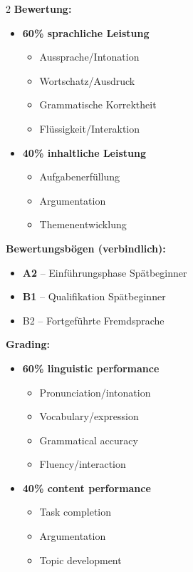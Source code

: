 \documentclass[10pt,a4paper]{article}
\begin{document}
\begin{paracol}{2}
\small
\textbf{Bewertung:}
\begin{itemize}[noitemsep,topsep=2pt]
\item \textbf{60\% sprachliche Leistung}
\begin{itemize}[noitemsep,topsep=1pt]
\item[-] Aussprache/Intonation
\item[-] Wortschatz/Ausdruck
\item[-] Grammatische Korrektheit
\item[-] Flüssigkeit/Interaktion
\end{itemize}
\item \textbf{40\% inhaltliche Leistung}
\begin{itemize}[noitemsep,topsep=1pt]
\item[-] Aufgabenerfüllung
\item[-] Argumentation
\item[-] Themenentwicklung
\end{itemize}
\end{itemize}

\textbf{Bewertungsbögen (verbindlich):}\footnotemark[12]
\begin{itemize}[noitemsep,topsep=2pt]
\item \textcolor{spaet}{\textbf{A2}} -- Einführungsphase Spätbeginner
\item \textcolor{spaet}{\textbf{B1}} -- Qualifikation Spätbeginner
\item B2 -- Fortgeführte Fremdsprache
\end{itemize}

\switchcolumn

\small\color{english}
\textbf{Grading:}
\begin{itemize}[noitemsep,topsep=2pt]
\item \textbf{60\% linguistic performance}
\begin{itemize}[noitemsep,topsep=1pt]
\item[-] Pronunciation/intonation
\item[-] Vocabulary/expression
\item[-] Grammatical accuracy
\item[-] Fluency/interaction
\end{itemize}
\item \textbf{40\% content performance}
\begin{itemize}[noitemsep,topsep=1pt]
\item[-] Task completion
\item[-] Argumentation
\item[-] Topic development
\end{itemize}
\end{itemize}


\end{paracol}
\end{document}
